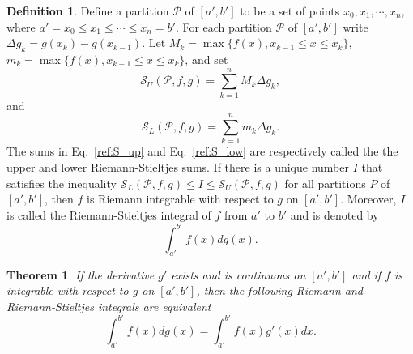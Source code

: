 \documentclass{article}
\theoremstyle{theorem}
\newtheorem{theorem}{Theorem}
\theoremstyle{definition}
\newtheorem*{definition}{Definition}
\begin{document}
\begin{definition}
Define a partition $\mathcal{P}$ of $[a',b']$ to be a set of points $x_0, x_1,\cdots,x_n$, 
where $a' = x_0 \leq x_1 \leq \cdots \leq x_n = b'$. For each partition 
$\mathcal{P}$ of $[a',b']$ write $\Delta g_k = g(x_k)-g(x_{k-1})$. Let 
$M_k = \max\{f(x),x_{k-1}\leq x \leq x_{k}\}$, $m_k = \max\{f(x),x_{k-1}\leq x \leq x_{k}\}$, and set 
\begin{equation}
\label{ref:S_up}
\mathcal{S}_U(\mathcal{P},f,g) = \sum_{k=1}^n M_k \Delta g_k, 
\end{equation}
and
\begin{equation}
\label{ref:S_low}
\mathcal{S}_L(\mathcal{P},f,g) = \sum_{k=1}^n m_k \Delta g_k. 
\end{equation}
The sums in Eq.~\eqref{ref:S_up} and Eq.~\eqref{ref:S_low} are respectively called the the upper and lower Riemann-Stieltjes sums.
If there is a unique number $I$ that satisfies the inequality $\mathcal{S}_L(\mathcal{P},f,g)\leq I \leq \mathcal{S}_U(\mathcal{P},f,g)$ for all 
partitions $P$ of $[a',b']$, then $f$ is Riemann integrable with respect to $g$ on $[a',b']$. Moreover, $I$ is called the Riemann-Stieltjes integral of $f$ from $a'$ to $b'$ and is denoted by
\begin{equation}
\int_{a'}^{b'} f(x) dg(x). 
\end{equation}
\end{definition}

\begin{theorem}
If the derivative $g'$ exists and is continuous on $[a',b']$ and if $f$ is integrable with respect to $g$ on $[a',b']$, then the following 
Riemann and Riemann-Stieltjes integrals are equivalent
\begin{equation}
\int_{a'}^{b'} f(x) dg(x) = \int_{a'}^{b'} f(x)g'(x)dx.
\end{equation}
\end{theorem}


\end{document}
